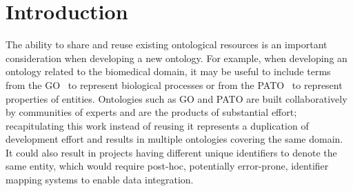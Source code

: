 \documentclass[jou]{ao2e}%
\begin{document}
\section{Introduction}

The ability to share and reuse existing ontological resources is an important consideration when developing a new ontology.
For example, when developing an ontology related to the biomedical domain, it may be useful to include terms from the \ac{GO}~\citep{GO} to represent biological processes or from the \ac{PATO}~\citep{PATO} to represent properties of entities.
Ontologies such as GO and PATO are built collaboratively by communities of experts and are the products of substantial effort; recapitulating this work instead of reusing it represents a duplication of development effort and results in multiple ontologies covering the same domain. It could also result in projects having different unique identifiers to denote the same entity, which would require post-hoc, potentially error-prone, identifier mapping systems to enable data integration. 
\end{document}
